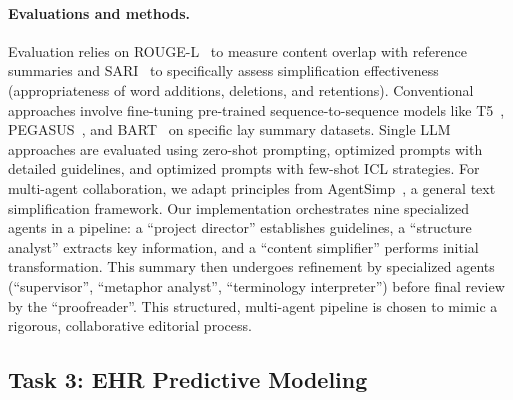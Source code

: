 \documentclass{article}
\begin{document}
\paragraph{Evaluations and methods.} Evaluation relies on ROUGE-L~\cite{lin2004rouge} to measure content overlap with reference summaries and SARI~\cite{xu2016optimizing} to specifically assess simplification effectiveness (appropriateness of word additions, deletions, and retentions). Conventional approaches involve fine-tuning pre-trained sequence-to-sequence models like T5~\cite{raffel2020t5}, PEGASUS~\cite{zhang2020pegasus}, and BART~\cite{lewis2020bart} on specific lay summary datasets. Single LLM approaches are evaluated using zero-shot prompting, optimized prompts with detailed guidelines, and optimized prompts with few-shot ICL strategies. For multi-agent collaboration, we adapt principles from AgentSimp~\cite{fang2025AgentSimp}, a general text simplification framework. Our implementation orchestrates nine specialized agents in a pipeline: a ``project director'' establishes guidelines, a ``structure analyst'' extracts key information, and a ``content simplifier'' performs initial transformation. This summary then undergoes refinement by specialized agents (``supervisor'', ``metaphor analyst'', ``terminology interpreter'') before final review by the ``proofreader''. This structured, multi-agent pipeline is chosen to mimic a rigorous, collaborative editorial process.

\subsection{Task 3: EHR Predictive Modeling}
\label{subsec:task_ehrprediction}
\end{document}
